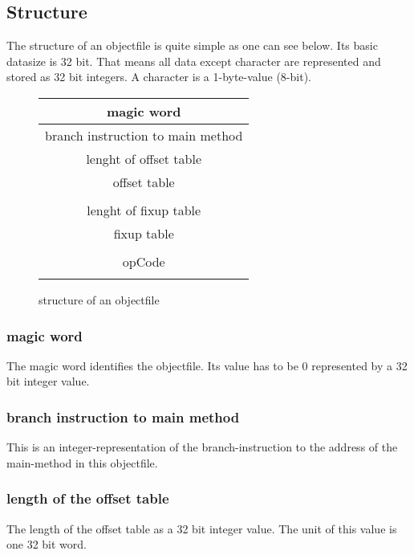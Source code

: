 \subsection{Structure}
\label{linker:objectfile:structure}
The structure of an objectfile is quite simple as one can see below. Its basic
datasize is 32 bit. That means all data except character are represented and 
stored as 32 bit integers. A character is a 1-byte-value (8-bit). \\
\begin{figure}[h]
	\begin{center}
	
		\begin{tabular}{|c|}
			\hline
			magic word \\
			\hline 
			branch instruction to main method \\
			\hline
			lenght of offset table \\
			\hline
			offset table \\ \\
			\hline
			lenght of fixup table \\
			\hline
			fixup table \\ \\
			\hline
			opCode \\ \\
			\hline 
		\end{tabular}
	
	\end{center}

\caption{structure of an objectfile}
\label{linker:objectfile:example:structure}

\end{figure} 

\subsubsection{magic word} 
\label{linker:objectfile:magic_word}
The magic word identifies the objectfile. Its value has to be $0$ represented
by a 32 bit integer value. 
\subsubsection{branch instruction to main method}
\label{linker:objectfile:branch_to_main}
This is an integer-representation of the branch-instruction to the address of
the main-method in this objectfile. 
\subsubsection{length of the offset table}
\label{linker:objectfile:length_offset_table}
The length of the offset table as a 32 bit integer value. The unit of this value
is one 32 bit word. 
